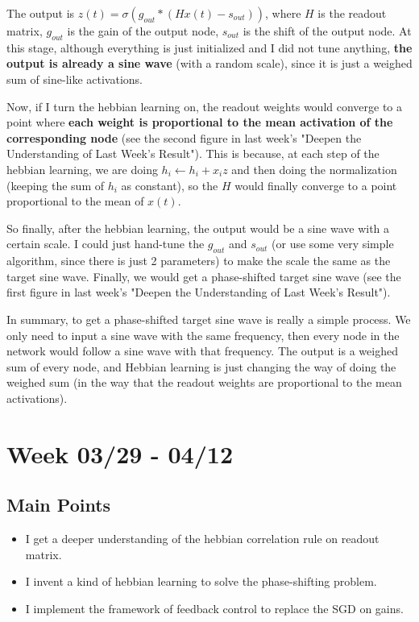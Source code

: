 \documentclass[12pt, a4paper]{article}
\begin{document}
The output is $z(t)=\sigma(g_{out}*(Hx(t)-s_{out}))$, where $H$ is the readout matrix, $g_{out}$ is the gain of the output node, $s_{out}$ is the shift of the output node. At this stage, although everything is just initialized and I did not tune anything, \textbf{the output is already a sine wave} (with a random scale), since it is just a weighed sum of sine-like activations.

Now, if I turn the hebbian learning on, the readout weights would converge to a point where \textbf{each weight is proportional to the mean activation of the corresponding node} (see the second figure in last week's "Deepen the Understanding of Last Week's Result"). This is because, at each step of the hebbian learning, we are doing $h_i \leftarrow h_i + x_i z$ and then doing the normalization (keeping the sum of $h_i$ as constant), so the $H$ would finally converge to a point proportional to the mean of $x(t)$.

So finally, after the hebbian learning, the output would be a sine wave with a certain scale. I could just hand-tune the $g_{out}$ and $s_{out}$ (or use some very simple algorithm, since there is just 2 parameters) to make the scale the same as the target sine wave. Finally, we would get a phase-shifted target sine wave (see the first figure in last week's "Deepen the Understanding of Last Week's Result").

In summary, to get a phase-shifted target sine wave is really a simple process. We only need to input a sine wave with the same frequency, then every node in the network would follow a sine wave with that frequency. The output is a weighed sum of every node, and Hebbian learning is just changing the way of doing the weighed sum (in the way that the readout weights are proportional to the mean activations).

\newpage

\section*{Week 03/29 - 04/12}

\subsection*{Main Points}

\noindent
\begin{itemize}
    \item I get a deeper understanding of the hebbian correlation rule on readout matrix.
    \item I invent a kind of hebbian learning to solve the phase-shifting problem.
    \item I implement the framework of feedback control to replace the SGD on gains.

\end{itemize}
\end{document}
